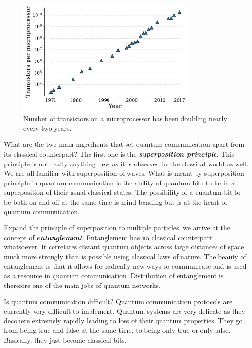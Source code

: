 \begin{figure}[t]
    \centering
    \includegraphics[width=0.8\textwidth]{lesson1/1-4_transistors.pdf}
    \caption[Moore's law.]{Number of transistors on a microprocessor has been doubling nearly every two years.}
    \label{fig:1-4_transistors}
\end{figure}

What are the two main ingredients that set quantum communication apart from its classical counterpart?
The first one is the \textit{\textbf{superposition principle}}.
This principle is not really anything new as it is observed in the classical world as well.
We are all familiar with superposition of waves.
What is meant by superposition principle in quantum communication is the ability of quantum bits to be in a superposition of their usual classical states.
The possibility of a quantum bit to be both on and off at the same time is mind-bending but is at the heart of quantum communication.

Expand the principle of superposition to multiple particles, we arrive at the concept of \textit{\textbf{entanglement}}.
Entanglement has no classical counterpart whatsoever.
It correlates distant quantum objects across large distances of space much more strongly than is possible using classical laws of nature.
The beauty of entanglement is that it allows for radically new ways to communicate and is used as a resource in quantum communication.
Distribution of entanglement is therefore one of the main jobs of quantum networks.

Is quantum communication difficult?
Quantum communication protocols are currently very difficult to implement.
Quantum systems are very delicate as they decohere extremely rapidly leading to loss of their quantum properties.
They go from being true and false at the same time, to being only true or only false.
Basically, they just become classical bits.

